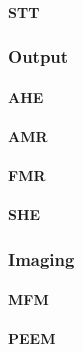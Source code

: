 \paragraph{STT} %
\subsubsection{Output}
\paragraph{AHE} %
\cite{AHE,AHE_Culcer}
\paragraph{AMR} %
\paragraph{FMR} %
\paragraph{SHE} %
\cite{SHE}
\subsubsection{Imaging} %
\paragraph{MFM} %
\paragraph{PEEM}
